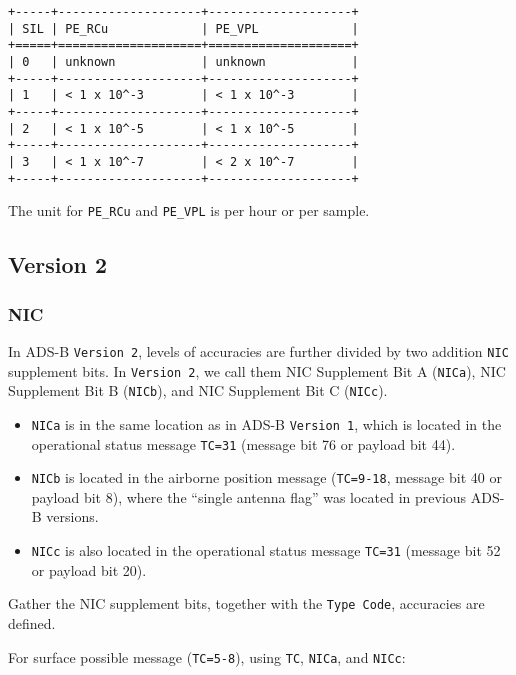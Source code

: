 \begin{verbatim}
+-----+--------------------+--------------------+
| SIL | PE_RCu             | PE_VPL             |
+=====+====================+====================+
| 0   | unknown            | unknown            |
+-----+--------------------+--------------------+
| 1   | < 1 x 10^-3        | < 1 x 10^-3        |
+-----+--------------------+--------------------+
| 2   | < 1 x 10^-5        | < 1 x 10^-5        |
+-----+--------------------+--------------------+
| 3   | < 1 x 10^-7        | < 2 x 10^-7        |
+-----+--------------------+--------------------+
\end{verbatim}

The unit for \texttt{PE\_RCu} and \texttt{PE\_VPL} is per hour or per
sample.

\subsection{Version 2}\label{version-2}

\subsubsection{NIC}\label{nic-1}

In ADS-B \texttt{Version\ 2}, levels of accuracies are further divided
by two addition \texttt{NIC} supplement bits. In \texttt{Version\ 2}, we
call them NIC Supplement Bit A (\texttt{NICa}), NIC Supplement Bit B
(\texttt{NICb}), and NIC Supplement Bit C (\texttt{NICc}).

\begin{itemize}

\item
  \texttt{NICa} is in the same location as in ADS-B \texttt{Version\ 1},
  which is located in the operational status message \texttt{TC=31}
  (message bit 76 or payload bit 44).
\item
  \texttt{NICb} is located in the airborne position message
  (\texttt{TC=9-18}, message bit 40 or payload bit 8), where the
  ``single antenna flag'' was located in previous ADS-B versions.
\item
  \texttt{NICc} is also located in the operational status message
  \texttt{TC=31} (message bit 52 or payload bit 20).
\end{itemize}

Gather the NIC supplement bits, together with the \texttt{Type\ Code},
accuracies are defined.

For surface possible message (\texttt{TC=5-8}), using \texttt{TC},
\texttt{NICa}, and \texttt{NICc}:

